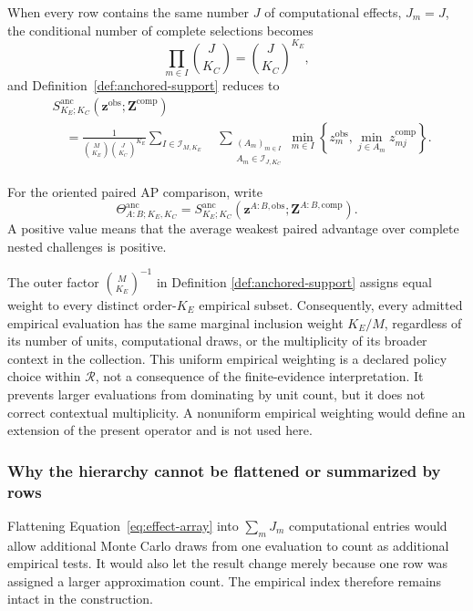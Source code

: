 \documentclass[11pt]{article}
\newcommand{\Regime}{\mathcal{R}}
\newcommand{\Sanc}{S^{\mathrm{anc}}}
\newcommand{\Thetaanc}{\Theta^{\mathrm{anc}}}
\theoremstyle{remark}
\begin{document}
When every row contains the same number $J$ of computational effects,
$J_m=J$, the conditional number of complete selections becomes
\[
\prod_{m\in I}\binom{J}{K_C}
=
\binom{J}{K_C}^{K_E},
\]
and Definition~\ref{def:anchored-support} reduces to
\begin{align*}
&\Sanc_{K_E;K_C}
\left(\mathbf z^{\mathrm{obs}};\mathbf Z^{\mathrm{comp}}\right)\\
&\quad=
\frac{1}{\binom{M}{K_E}\binom{J}{K_C}^{K_E}}
\sum_{I\in\mathcal I_{M,K_E}}
\quad
\sum_{\substack{
(A_m)_{m\in I}\\
A_m\in\mathcal I_{J,K_C}}}
\min_{m\in I}
\left\{
z_m^{\mathrm{obs}},
\min_{j\in A_m}z_{mj}^{\mathrm{comp}}
\right\}.
\end{align*}

For the oriented paired AP comparison, write
\begin{equation}
\Thetaanc_{A:B;K_E,K_C}
=
\Sanc_{K_E;K_C}
\left(
\mathbf z^{A:B,\mathrm{obs}};
\mathbf Z^{A:B,\mathrm{comp}}
\right).
\label{eq:anchored-paired-support}
\end{equation}
A positive value means that the average weakest paired advantage over complete
nested challenges is positive.

The outer factor $\binom{M}{K_E}^{-1}$ in Definition
\ref{def:anchored-support} assigns equal weight to every distinct order-$K_E$
empirical subset. Consequently, every admitted empirical evaluation has the
same marginal inclusion weight $K_E/M$, regardless of its number of units,
computational draws, or the multiplicity of its broader context in the
collection. This uniform empirical weighting is a declared policy choice
within $\Regime$, not a consequence of the finite-evidence interpretation. It
prevents larger evaluations from dominating by unit count, but it does not
correct contextual multiplicity. A nonuniform empirical weighting would define
an extension of the present operator and is not used here.

\subsubsection{Why the hierarchy cannot be flattened or summarized by rows}

Flattening Equation~\eqref{eq:effect-array} into $\sum_mJ_m$ computational
entries would allow additional Monte Carlo draws from one evaluation to count
as additional empirical tests. It would also let the result change merely
because one row was assigned a larger approximation count. The empirical
index therefore remains intact in the construction.
\end{document}
